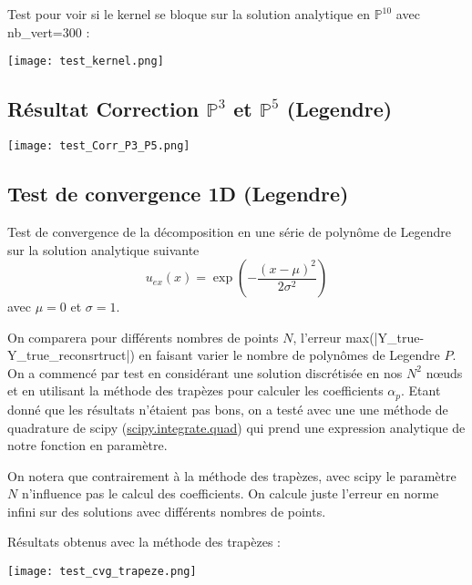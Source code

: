 Test pour voir si le kernel se bloque sur la solution analytique en $\mathbb{P}^{10}$ avec nb\_vert=300 :

\begin{minipage}{\linewidth}
	\centering
	\texttt{[image: test\_kernel.png]}
\end{minipage}

\subsection{Résultat Correction $\mathbb{P}^3$ et $\mathbb{P}^5$ (Legendre)}

\begin{minipage}{\linewidth}
	\centering
	\texttt{[image: test\_Corr\_P3\_P5.png]}
\end{minipage}

\subsection{Test de convergence 1D (Legendre)}

Test de convergence de la décomposition en une série de polynôme de Legendre sur la solution analytique suivante
$$u_{ex}(x) = \exp\left(-\frac{(x-\mu)^2}{2\sigma^2}\right)$$
avec $\mu=0$ et $\sigma=1$.

On comparera pour différents nombres de points $N$, l'erreur max(|Y\_true-Y\_true\_reconsrtruct|) en faisant varier le nombre de polynômes de Legendre $P$. On a commencé par test en considérant une solution discrétisée en nos $N^2$ nœuds et en utilisant la méthode des trapèzes pour calculer les coefficients $\alpha_p$. Etant donné que les résultats n'étaient pas bons, on a testé avec une une méthode de quadrature de scipy (\href{https://docs.scipy.org/doc/scipy/reference/generated/scipy.integrate.quad.html#scipy.integrate.quad}{scipy.integrate.quad}) qui prend une expression analytique de notre fonction en paramètre.

\begin{Rem}
	On notera que contrairement à la méthode des trapèzes, avec scipy le paramètre $N$ n'influence pas le calcul des coefficients. On calcule juste l'erreur en norme infini sur des solutions avec différents nombres de points.
\end{Rem}

Résultats obtenus avec la méthode des trapèzes :

\begin{minipage}{\linewidth}
	\centering
	\texttt{[image: test\_cvg\_trapeze.png]}
\end{minipage}

